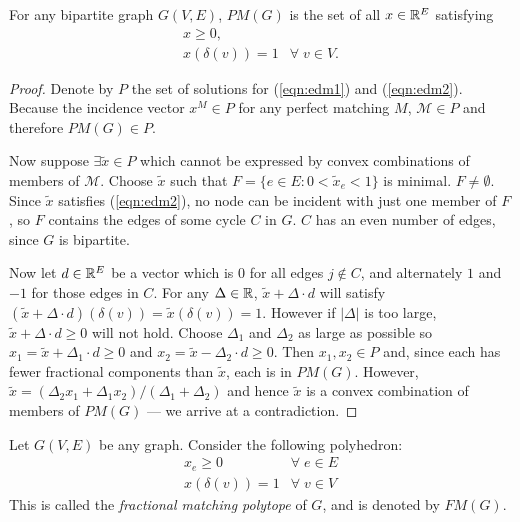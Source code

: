 \begin{theorem}
	For any bipartite graph $G(V, E)$, $PM(G)$ is the set of all $x \in \mathbb{R}^E$ satisfying
  \begin{eqnarray}
	  x \geq 0, \label{eqn:edm1} \\
	  x(\delta(v)) = 1 & \forall \; v \in V. \label{eqn:edm2}
  \end{eqnarray}
  \label{thm:edm}
\end{theorem}
\begin{proof}
Denote by $P$ the set of solutions for (\ref{eqn:edm1}) and (\ref{eqn:edm2}). Because the incidence vector $x^M \in P$ for any perfect matching $M$, $\mathcal{M} \in P$ and therefore $PM(G) \in P$.

Now suppose $\exists \tilde{x} \in P$ which cannot be expressed by convex combinations of members of $\mathcal{M}$. Choose $\tilde{x}$ such that $F = \{ e \in E : 0 < \tilde{x}_e < 1 \}$ is minimal. $F \neq \emptyset$. Since $\tilde{x}$ satisfies (\ref{eqn:edm2}), no node can be incident with just one member of $F$, so $F$ contains the edges of some cycle $C$ in $G$. $C$ has an even number of edges, since $G$ is bipartite.

Now let $d \in \mathbb{R}^E$ be a vector which is $0$ for all edges $j \notin C$, and alternately $1$ and $-1$ for those edges in $C$. For any $\Delta \in \mathbb{R}$, $\tilde{x} + \Delta \cdot d$ will satisfy $(\tilde{x} + \Delta \cdot d)(\delta(v)) = \tilde{x}(\delta(v)) = 1$. However if $|\Delta|$ is too large, $\tilde{x} + \Delta \cdot d \geq 0$ will not hold. Choose $\Delta_1$ and $\Delta_2$ as large as possible so $x_1 = \tilde{x} + \Delta_1 \cdot d \geq 0$ and $x_2 = \tilde{x} - \Delta_2 \cdot d \geq 0$. Then $x_1, x_2 \in P$ and, since each has fewer fractional components than $\tilde{x}$, each is in $PM(G)$. However, $\tilde{x} = (\Delta_2 x_1 + \Delta_1 x_2) / (\Delta_1 + \Delta_2)$ and hence $\tilde{x}$ is a convex combination of members of $PM(G)$ --- we arrive at a contradiction.
\end{proof}

Let $G(V, E)$ be any graph. Consider the following polyhedron:
\begin{eqnarray}
	x_e \geq 0 & \forall \; e \in E \nonumber \\
	x(\delta(v)) = 1 & \forall \; v \in V \nonumber
\end{eqnarray}
This is called the \emph{fractional matching polytope} of $G$, and is denoted by $FM(G)$. 

